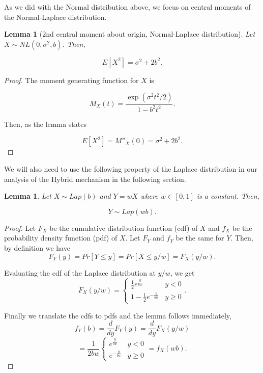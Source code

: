 \documentclass[sigconf]{acmart}
\theoremstyle{plain}
\newtheorem{lem}[thm]{Lemma}
\begin{document}
As we did with the Normal distribution above, we focus on central moments of the Normal-Laplace distribution.

\begin{lem}[2nd central moment about origin, Normal-Laplace distribution]
\label{nl_secmom}
Let $X \sim NL(0, \sigma^2, b)$. Then, 

$$E[X^2] = \sigma^2 + 2b^2.$$
\end{lem}

\begin{proof}
The moment generating function for $X$ is

$$M_X(t) = \frac{\exp(\sigma^2t^2/2)}{1 - b^2t^2}.$$

Then, as the lemma states

$$E[X^2] = M''_X(0) = \sigma^2 + 2b^2.$$
\end{proof}

We will also need to use the following property of the Laplace distribution in our analysis of the Hybrid mechanism in the following section. 

\begin{lem} \label{wtimeslap}
Let $X \sim Lap(b)$ and $Y = wX$ where $w \in [0,1]$ is a constant. Then, 

$$Y \sim Lap(wb).$$
\end{lem}

\begin{proof}
Let $F_X$ be the cumulative distribution function (cdf) of $X$ and $f_X$ be the probability density function (pdf) of $X$. Let $F_Y$ and $f_Y$ be the same for $Y$. Then, by definition we have 
$$F_Y(y) = Pr[Y \leq y] = Pr[X \leq y/w] = F_X(y/w).$$
	
Evaluating the cdf of the Laplace distribution at $y/w$, we get 
$$F_X(y/w) = 
	\begin{cases} 
      \frac{1}{2}e^{\frac{y}{bw}} & y < 0 \\
      1 - \frac{1}{2}e^{-\frac{y}{bw}} & y \geq 0 
	\end{cases} .$$
	
Finally we translate the cdfs to pdfs and the lemma follows immediately, 
$$f_Y(b) = \frac{d}{dy}F_Y(y) = \frac{d}{dy}F_X(y/w) $$
$$= \frac{1}{2bw}
	\begin{cases} 
      e^{\frac{y}{bw}} & y < 0 \\
      e^{-\frac{y}{bw}} & y \geq 0 
	\end{cases}
     = f_X(wb).$$
\end{proof}
\end{document}
